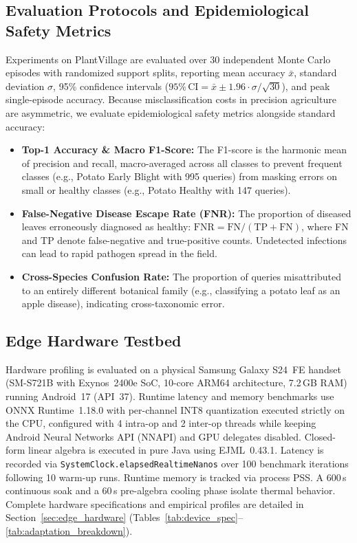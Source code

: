 \documentclass[preprint,12pt]{elsarticle}
\begin{document}
\subsection{Evaluation Protocols and Epidemiological Safety Metrics}
\label{sec:metrics}
Experiments on PlantVillage are evaluated over 30 independent Monte Carlo episodes with randomized support splits, reporting mean accuracy $\bar{x}$, standard deviation $\sigma$, 95\% confidence intervals ($95\%\,\text{CI} = \bar{x} \pm 1.96 \cdot \sigma / \sqrt{30}$), and peak single-episode accuracy. Because misclassification costs in precision agriculture are asymmetric, we evaluate epidemiological safety metrics alongside standard accuracy:
\begin{itemize}
    \item \textbf{Top-1 Accuracy \& Macro F1-Score:} The F1-score is the harmonic mean of precision and recall, macro-averaged across all classes to prevent frequent classes (e.g., Potato Early Blight with 995 queries) from masking errors on small or healthy classes (e.g., Potato Healthy with 147 queries).
    \item \textbf{False-Negative Disease Escape Rate (FNR):} The proportion of diseased leaves erroneously diagnosed as healthy: $\text{FNR} = \text{FN} / (\text{TP} + \text{FN})$, where FN and TP denote false-negative and true-positive counts. Undetected infections can lead to rapid pathogen spread in the field.
    \item \textbf{Cross-Species Confusion Rate:} The proportion of queries misattributed to an entirely different botanical family (e.g., classifying a potato leaf as an apple disease), indicating cross-taxonomic error.
\end{itemize}

\subsection{Edge Hardware Testbed}
Hardware profiling is evaluated on a physical Samsung Galaxy S24~FE handset (SM-S721B with Exynos~2400e SoC, 10-core ARM64 architecture, 7.2\,GB RAM) running Android~17 (API~37). Runtime latency and memory benchmarks use ONNX Runtime~1.18.0 with per-channel INT8 quantization executed strictly on the CPU, configured with 4 intra-op and 2 inter-op threads while keeping Android Neural Networks API (NNAPI) and GPU delegates disabled. Closed-form linear algebra is executed in pure Java using EJML~0.43.1. Latency is recorded via \texttt{SystemClock.elapsedRealtimeNanos} over 100 benchmark iterations following 10 warm-up runs. Runtime memory is tracked via process PSS. A 600\,s continuous soak and a 60\,s pre-algebra cooling phase isolate thermal behavior. Complete hardware specifications and empirical profiles are detailed in Section~\ref{sec:edge_hardware} (Tables~\ref{tab:device_spec}--\ref{tab:adaptation_breakdown}).
\end{document}
